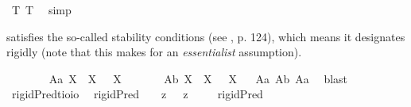 \begin{isabellebody}
\isamarkupfalse%
\ T{}\ T{}\ \isamarkupfalse%
\ simp\ \ %
%
\endisatagproof
{\isafoldproof}%
%
\isadelimproof
%
\endisadelimproof
%
\isamarkuptrue%
%
\begin{isamarkuptext}%
\isa{{\isasymP}} satisfies the so-called stability conditions (see \cite{Fitting}, p. 124), which means
 it designates rigidly (note that this makes for an \emph{essentialist} assumption).%
\end{isamarkuptext}\isamarkuptrue%
\isamarkupfalse%
\ \isanewline
\ \ \ \ \ \ A{}a{\isacharcolon}\ {\isachardoublequoteopen}{\isasymlfloor}\isactrlbold {\isasymforall}X{\isachardot}\ {\isasymP}\ X\ \isactrlbold {\isasymrightarrow}\ \isactrlbold {\isasymbox}{\isacharparenleft}{\isasymP}\ X{\isacharparenright}{\isasymrfloor}{\isachardoublequoteclose}\ \ \ \ \ \ %
\isanewline
{}\isamarkupfalse%
\ A{}b{\isacharcolon}\ {\isachardoublequoteopen}{\isasymlfloor}\isactrlbold {\isasymforall}X{\isachardot}\ \isactrlbold {\isasymnot}{\isacharparenleft}{\isasymP}\ X{\isacharparenright}\ \isactrlbold {\isasymrightarrow}\ \isactrlbold {\isasymbox}\isactrlbold {\isasymnot}{\isacharparenleft}{\isasymP}\ X{\isacharparenright}{\isasymrfloor}{\isachardoublequoteclose}%
\isadelimproof
\ %
\endisadelimproof
%
\isatagproof
{}\isamarkupfalse%
\ A{}a\ A{}b\ A{}a\ \isamarkupfalse%
\ blast%
\endisatagproof
{\isafoldproof}%
%
\isadelimproof
%
\endisadelimproof
\isanewline
\ \ \ \ \isanewline
{}\isamarkupfalse%
\ rigidPred{\isacharcolon}{\isacharcolon}{\isachardoublequoteopen}{\isacharparenleft}{\isacharprime}t{\isasymRightarrow}io{\isacharparenright}{\isasymRightarrow}io{\isachardoublequoteclose}\ \isanewline
\ {\isachardoublequoteopen}rigidPred\ {\isasymtau}\ {\isasymequiv}\ {\isacharparenleft}{\isasymlambda}{\isasymbeta}{\isachardot}\ \isactrlbold {\isasymbox}{\isacharparenleft}{\isacharparenleft}{\isasymlambda}z{\isachardot}\ {\isasymbeta}\ \isactrlbold {\isasymapprox}\ z{\isacharparenright}\ \isactrlbold {\isasymdown}{\isasymtau}{\isacharparenright}{\isacharparenright}\ \isactrlbold {\isasymdown}{\isasymtau}{\isachardoublequoteclose}\isanewline
\ \isanewline
{}\isamarkupfalse%
\ {\isachardoublequoteopen}{\isasymlfloor}rigidPred\ {\isasymP}{\isasymrfloor}{\isachardoublequoteclose}\ \isanewline

\end{isabellebody}
